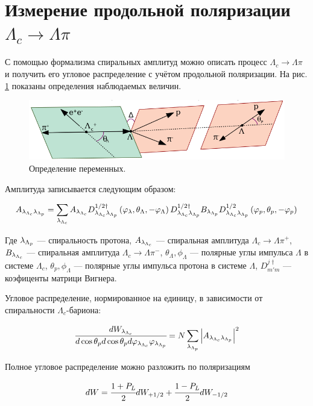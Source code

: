 \section{Измерение продольной поляризации $\Lambda_c \to \Lambda \pi$}

С помощью формализма спиральных амплитуд \textbf{\cite{Richman}} можно описать процесс 
$\Lambda_c \to \Lambda \pi$ и получить его угловое распределение с 
учётом продольной поляризации. На рис. \ref{def:val} показаны определения 
наблюдаемых величин. 

\begin{figure}[H]
    \centering
    \includegraphics[width=0.7\linewidth]{img/lpi_def.png}
    \caption{Определение переменных.}
    \label{def:val}
\end{figure}

Амплитуда записывается следующим образом:

\begin{equation}
    A_{\lambda_{\Lambda_{c}} \lambda_{\Lambda_{p}}} = \sum_{\lambda_{\Lambda_{c}}} A_{\lambda_{\Lambda_{c}}} D^{1/2\dag}_{\lambda_{\Lambda_{c}} \lambda_{\Lambda_{p}}}\left(\varphi_\lambda, \theta_\Lambda, -\varphi_\Lambda \right) D^{1/2\dag}_{\lambda_{\Lambda_{c}} \lambda_{\Lambda_{p}}} B_{\lambda_{\Lambda_{p}}} D^{1/2}_{\lambda_{\Lambda_{c}} \lambda_{\Lambda_{p}}}\left(\varphi_p, \theta_p, -\varphi_p \right)
\end{equation}

Где $\lambda_{\Lambda_{p}}$ --- спиральность протона, 
$A_{\lambda_{\Lambda_{c}}}$ --- спиральная амплитуда $\Lambda_c \to \Lambda \pi^+$, 
$B_{\lambda_{\Lambda_{c}}}$ --- спиральная амплитуда $\Lambda_c \to \Lambda \pi^-$,
$\theta_\Lambda, \phi_\Lambda$ --- полярные углы импульса $\Lambda$ в системе $\Lambda_c$,
$\theta_p, \phi_\Lambda$ --- полярные углы импульса протона в системе $\Lambda$, 
$D^{j\dag}_{m' m}$ --- коэфиценты матрици Вигнера.

Угловое распределение, нормированное на единицу, в зависимости от
спиральности $\Lambda_c$-бариона:

\begin{equation}
    \cfrac{dW_{\lambda_{\Lambda_{c}}}}{d\cos{\theta_p}d\cos{\theta_p}d\varphi_{\lambda_{\Lambda_{c}}}\varphi_{\lambda_{\Lambda_{p}}}} = N \sum_{\lambda_{\Lambda_{p}}} \abs{A_{\lambda_{\Lambda_{c}} \lambda_{\Lambda_{p}}}}^2 
\end{equation}

Полное угловое распределение можно разложить по поляризациям

\begin{equation}
    dW = \cfrac{1+P_L}{2} dW_{+1/2} + \cfrac{1-P_L}{2} dW_{-1/2} 
\end{equation}


